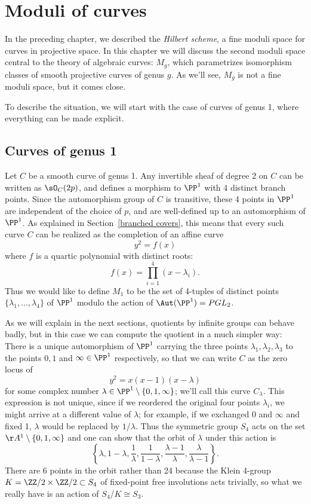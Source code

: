


\chapter{Moduli of curves} 
\label{CurvesModuli chapter}\label{CurvesModuliChapter}


In the preceding chapter, we described the \emph{Hilbert scheme}, a fine moduli space for curves in projective space. In
this chapter we will discuss the second moduli space central to the theory of algebraic curves: $M_g$, which parametrizes isomorphism classes of smooth projective curves of genus $g$. As we'll see, $M_g$ is not a fine moduli space, but it comes close.

To describe the situation,  we will start with the case of curves of genus 1, where everything can be made explicit.


\section{Curves of genus 1}\label{Curves of genus 1}

Let $C$ be a smooth curve of genus 1. Any invertible sheaf of degree 2 on $C$ can be written as
$\sO_C(2p)$, and defines
a morphism to $\PP^1$ with 4 distinct branch points. Since the automorphism group of $C$ is transitive,
these 4 points in $\PP^1$ are independent of the choice of $p$, and are well-defined
up to an automorphism of $\PP^1$.    As explained in Section~\ref{branched covers},  this means that every such curve $C$ can be realized as the completion of an affine curve
$$
y^2 = f(x)
$$
where $f$ is a quartic polynomial with distinct roots:
$$
f(x) = \prod_{i=1}^4 (x - \lambda_i).
$$
Thus we would like to define $M_1$ to be the set of 4-tuples of distinct points $\{\lambda_{1}, \dots, \lambda_{4}\}$ of $\PP^1$ modulo the action of $\Aut(\PP^1) = PGL_2$.

As we will explain in the next sections, quotients by infinite groups can behave badly,
but in this case we can compute the quotient in a much simpler way:
There is a unique automorphism of $\PP^1$ carrying the three points $\lambda_1, \lambda_2,\lambda_3$ to the points $0, 1$ and $\infty \in \PP^1$ respectively, so that we can write $C$ as the zero locus of
$$
y^2 = x(x-1)(x-\lambda)
$$
for some complex number $\lambda  \in \PP^1 \setminus \{0,1,\infty\}$; we'll call this curve $C_\lambda$. 
This expression is not unique, since if we reordered the original  four points $\lambda_i$, we might arrive at a different value of $\lambda$; for example, if we exchanged 0 and $\infty$ and fixed 1, $\lambda$ would be replaced by $1/\lambda$. Thus the symmetric group $S_4$ acts on the set $\AA^1 \setminus \{0,1,\infty\}$
and one can show that the orbit of $\lambda$ under this action is
$$
 \left\{ \lambda, 1-\lambda, \frac{1}{\lambda}, \frac{1}{1-\lambda}, \frac{\lambda-1}{\lambda}, \frac{\lambda}{\lambda - 1} \right\}.
$$
There are 6 points in the orbit rather than 24 because the Klein 4-group
$K = \ZZ/2\times \ZZ/2 \subset S_4$ of fixed-point free involutions acts trivially, so what we really have is an action of $S_4/K \cong S_3$.

